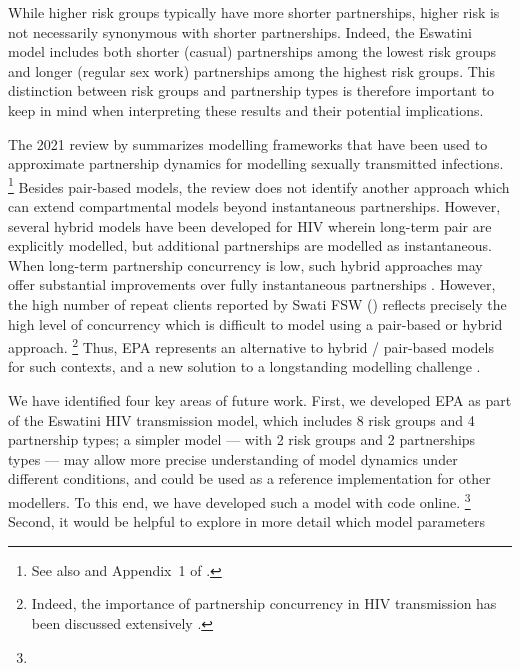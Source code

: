 While higher risk groups typically have more shorter partnerships,
higher risk is not necessarily synonymous with shorter partnerships.
Indeed, the Eswatini model includes both
shorter (casual) partnerships among the lowest risk groups and
longer (regular sex work) partnerships among the highest risk groups.
This distinction between risk groups and partnership types
is therefore important to keep in mind
when interpreting these results and their potential implications.
\par %
The 2021 review by \citet{Rao2021} summarizes
modelling frameworks that have been used to
approximate partnership dynamics for modelling sexually transmitted infections.%
\footnote{See also  and Appendix~1 of \cite{Johnson2016mf}.}
Besides pair-based models, the review does not identify another approach
which can extend compartmental models beyond instantaneous partnerships.
However, several hybrid models have been developed for HIV \cite{Xiridou2003,Powers2011ahi}
wherein long-term pair are explicitly modelled,
but additional partnerships are modelled as instantaneous.
When long-term partnership concurrency is low, such hybrid approaches
may offer substantial improvements over fully instantaneous partnerships
\cite{Kretzschmar1998,Eames2002,Lloyd-Smith2004}.
However, the high number of repeat clients reported by Swati FSW ()
reflects precisely the high level of concurrency
which is difficult to model using a pair-based or hybrid approach.%
\footnote{Indeed, the importance of partnership concurrency in HIV transmission
  has been discussed extensively \cite{Boily2012}.}
Thus, EPA represents an alternative to hybrid / pair-based models for such contexts,
and a new solution to a longstanding modelling challenge \cite{Dietz1988sti}.
\par %
We have identified four key areas of future work.
First, we developed EPA as part of the Eswatini HIV transmission model,
which includes 8 risk groups and 4 partnership types;
a simpler model --- \eg with 2 risk groups and 2 partnerships types ---
may allow more precise understanding of model dynamics under different conditions,
and could be used as a reference implementation for other modellers.
To this end, we have developed such a model with code online.%
\footnote{}
Second, it would be helpful to explore in more detail which model parameters
